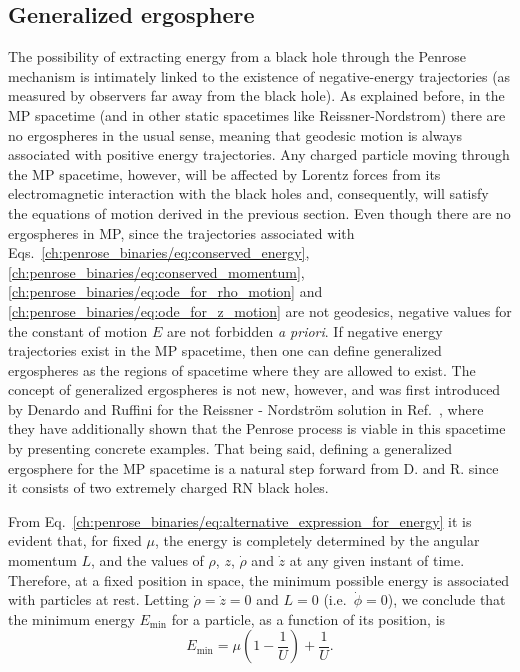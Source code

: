 \subsection{Generalized ergosphere}

The possibility of extracting energy from a black hole through the Penrose mechanism is intimately linked to the existence of negative-energy trajectories (as measured by observers far away from the black hole). As explained before, in the MP spacetime (and in other static spacetimes like Reissner-Nordstrom) there are no ergospheres in the usual sense, meaning that geodesic motion is always associated with positive energy trajectories. Any charged particle moving through the MP spacetime, however, will be affected by Lorentz forces from its electromagnetic interaction with the black holes and, consequently, will satisfy the equations of motion derived in the previous section. Even though there are no ergospheres in MP, since the trajectories associated with Eqs.~\eqref{ch:penrose_binaries/eq:conserved_energy}, \eqref{ch:penrose_binaries/eq:conserved_momentum}, \eqref{ch:penrose_binaries/eq:ode_for_rho_motion} and \eqref{ch:penrose_binaries/eq:ode_for_z_motion} are not geodesics, negative values for the constant of motion $E$ are not forbidden \emph{a priori}. If negative energy trajectories exist in the MP spacetime, then one can define generalized ergospheres as the regions of spacetime where they are allowed to exist. The concept of generalized ergospheres is not new, however, and was first introduced by Denardo and Ruffini for the Reissner - Nordstr\"om solution in Ref.~\cite{DENARDO1973}, where they have additionally shown that the Penrose process is viable in this spacetime by presenting concrete examples. That being said, defining a generalized ergosphere for the MP spacetime is a natural step forward from D. and R. since it consists of two extremely charged RN black holes.

From Eq.~\eqref{ch:penrose_binaries/eq:alternative_expression_for_energy} it is evident that, for fixed $\mu$, the energy is completely determined by the angular momentum $L$, and the values of $\rho$, $z$, $\dot{\rho}$ and $\dot{z}$  at any given instant of time. Therefore, at a fixed position in space, the minimum possible energy is associated with particles at rest. Letting $\dot{\rho}=\dot{z}=0$ and $L=0$ (i.e.~$\dot{\phi}=0$), we conclude that the minimum energy $E_{\mathrm{min}}$ for a particle, as a function of its position, is
\begin{equation} \label{ch:penrose_binaries/eq:minimum_energy}
  E_{\mathrm{min}} = \mu\left(1-\frac{1}{U}\right) + \frac{1}{U}.
\end{equation}

